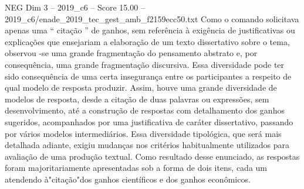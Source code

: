 \begin{textsample}{NEG Dim 3 – 2019\_c6 – Score 15.00 – 2019\_c6/enade\_2019\_tec\_gest\_amb\_f2159ecc50.txt}
Como o comando solicitava apenas uma “ citação ” de ganhos, sem referência à exigência de justificativas ou explicações que ensejariam a elaboração de um texto dissertativo sobre o tema, observou -se uma grande fragmentação do pensamento abstrato e, por consequência, uma grande fragmentação discursiva.
Essa diversidade pode ter sido consequência de uma certa insegurança entre os participantes a respeito de qual modelo de resposta produzir.
Assim, houve uma grande diversidade de modelos de resposta, desde a citação de duas palavras ou expressões, sem desenvolvimento, até a construção de respostas com detalhamento dos ganhos sugeridos, acompanhados por uma justificativa de caráter dissertativo, passando por vários modelos intermediários.
Essa diversidade tipológica, que será mais detalhada adiante, exigiu mudanças nos critérios habitualmente utilizados para avaliação de uma produção textual.
Como resultado desse enunciado, as respostas foram majoritariamente apresentadas sob a forma de dois itens, cada um atendendo à"citação"dos ganhos científicos e dos ganhos econômicos.

\end{textsample}
